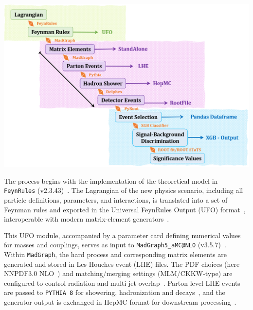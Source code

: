 \begin{center}
    \includegraphics[width=\textwidth]{Slides/2023_paper/Workflow.png}
    \label{fig:sim_workflow}
\end{center}

The process begins with the implementation of the theoretical model in \texttt{FeynRules} (v2.3.43)~\parencite{Christensen:2008py,Alloul:2013bka}. The Lagrangian of the new physics scenario, including all particle definitions, parameters, and interactions, is translated into a set of Feynman rules and exported in the Universal FeynRules Output (UFO) format~\cite{Degrande:2011ua}, interoperable with modern matrix-element generators~\cite{Alwall:2014hca}.

This UFO module, accompanied by a parameter card defining numerical values for masses and couplings, serves as input to \texttt{MadGraph5\_aMC@NLO} (v3.5.7)~\parencite{Alwall:2014bza,Alwall:2014hca}. Within \texttt{MadGraph}, the hard process and corresponding matrix elements are generated and stored in Les Houches event (LHE) files. The PDF choices (here NNPDF3.0 NLO~\parencite{NNPDF:2014otw}) and matching/merging settings (MLM/CKKW-type) are configured to control radiation and multi-jet overlap~\cite{Alwall:2007fs,Buckley:2015}. Parton-level LHE events are passed to \texttt{PYTHIA 8} for showering, hadronization and decays~\parencite{Sjostrand:2014zea}, and the generator output is exchanged in HepMC format for downstream processing~\cite{Dobbs:2001}.

